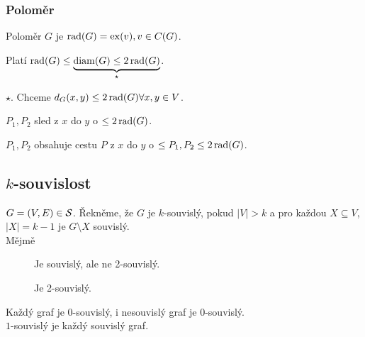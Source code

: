 \subsubsection{Poloměr}
Poloměr $G$ je $\rad(G) = \ex(v), v \in C(G)$.

Platí $\rad(G) \leq \underbrace{\diam(G) \leq 2 \rad(G)}_{\star}$.

 $\star$. Chceme $d_G(x,y) \leq 2 \rad(G) \forall x,y \in V$.
\begin{figure}[H]
\end{figure} %
$P_1, P_2$ sled z $x$ do $y$ o $\leq 2 \rad(G)$.

$P_1, P_2$ obsahuje cestu $P$ z $x$ do $y$ o $\leq P_1, P_2 \leq 2\rad(G)$.

\subsection{\texorpdfstring{$k$}{k}-souvislost}
$G = (V,E) \in \S$. Řekněme, že $G$ je $k$-souvislý, pokud $|V| > k$ a pro každou $X \subseteq V$, $|X| = k-1$ je 
$G \setminus X$ souvislý.\\
Mějmě
\begin{figure}[H]
    \centering
    \begin{minipage}[c]{0.3\textwidth}
        \begin{figure}[H]
        \end{figure}
        Je souvislý, ale ne 2-souvislý.
    \end{minipage}%
    \hspace{0.1\textwidth}
    \begin{minipage}[c]{0.3\textwidth}
        \begin{figure}[H]
        \end{figure}
        Je 2-souvislý.
    \end{minipage}
\end{figure}
Každý graf je $0$-souvislý, i nesouvislý graf je $0$-souvislý.\\
$1$-souvislý je každý souvislý graf.

